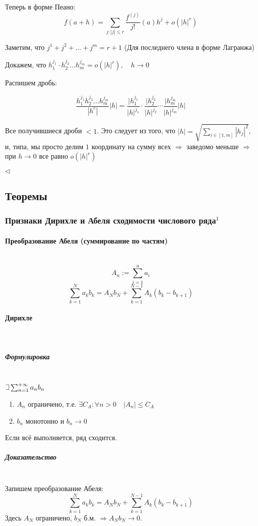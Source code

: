 \documentclass{article}
\def\letus{%
\mathord{\setbox0=\hbox{$\exists$}%
         \hbox{\kern 0.125\wd0%
               \vbox to \ht0{%
                  \hrule width 0.75\wd0%
                  \vfill%
                  \hrule width 0.75\wd0}%
               \vrule height \ht0%
               \kern 0.125\wd0}%
       }%
        }
\let\vanillaparagraph\paragraph
\let\vanillasubparagraph\subparagraph
\renewcommand{\paragraph}[1]{\vanillaparagraph{#1}\mbox{}\\}
\renewcommand{\subparagraph}[1]{\vanillasubparagraph{#1}\mbox{}\\}
\begin{document}
Теперь в форме Пеано:
$$
f(a + h) = \sum_{j:|j| \leq r} \frac{f^{(j)}}{j!}(a)h^j + o(|h|^r)
$$

Заметим, что $j^1 + j^2 + \dots +j^m = r+1$ (Для последнего члена в форме Лагранжа)

Докажем, что $h_1^{j_1} \cdot h_2^{j_2} \dots h_m^{j_m} = o(|h|^r),\quad h \to 0$

Распишем дробь:

$$
\frac{h_1^{j_1} h_2^{j_2} \dots h_m^{j_m}} {|h^r|} |h| = \frac{|h_1^{j_1}}{|h|^{j_1}} \cdot \frac{|h_2^{j_2}}{|h|^{j_2}} \cdots \frac{|h_m^{j_m}}{|h|^{j_m}} |h|
$$

Все получившиеся дроби $< 1$. Это следует из того, что $|h| = \sqrt{\sum_{i\in[1,m]} |h_j|^2}$, и, типа, мы просто делим $1$ координату на сумму всех $\Rightarrow$ заведомо меньше $\Rightarrow$ при $h\to0$ все равно $o(|h|^r)$

$\lhd$


\newpage
\subsection{Теоремы}

\subsubsection{Признаки Дирихле и Абеля сходимости числового ряда\texorpdfstring{$^1$}{}}
\paragraph{Преобразование Абеля (суммирование по частям)}
$$
A_n := \sum_{i=1}^n a_i
$$
$$
\sum_{k=1}^N a_k b_k = A_N b_N + \sum_{k=1}^{N-1} A_k (b_k - b_{k+1})
$$

\paragraph{Дирихле}
\subparagraph{Формулировка}
$\letus \sum_{n=1}^{+\infty} a_n b_n$
\begin{enumerate}
    \item $A_n$ ограничено, т.е. $\exists C_A : \forall n > 0 \quad |A_n| \le C_A$
    \item $b_n$ монотонно и $b_n \rightarrow 0$
\end{enumerate}
Если всё выполняется, ряд сходится. 

\subparagraph{Доказательство}
Запишем преобразование Абеля:
$$
\sum_{k=1}^N a_k b_k = A_N b_N + \sum_{k=1}^{N-1} A_k (b_k - b_{k+1})
$$
Здесь $A_N$ ограничено, $b_N$ б.м. $\Rightarrow A_N b_N \rightarrow 0$.
\end{document}
